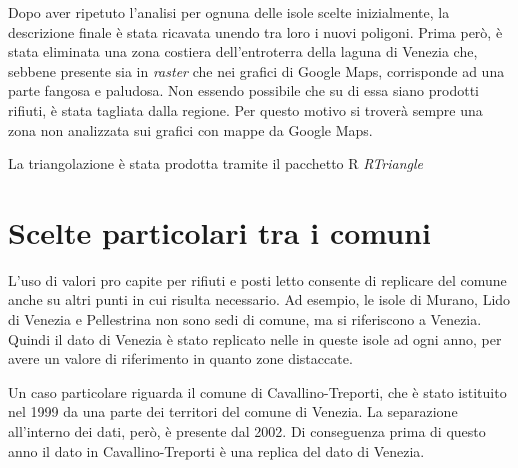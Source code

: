 \documentclass[a4paper,11pt,twoside,openright]{book}							%
\begin{document}
Dopo aver ripetuto l'analisi per ognuna delle isole scelte inizialmente, la descrizione finale è stata ricavata unendo tra loro i nuovi poligoni. Prima però, è stata eliminata una zona costiera dell'entroterra della laguna di Venezia che, sebbene presente sia in \textit{raster} che nei grafici di Google Maps, corrisponde ad una parte fangosa e paludosa. Non essendo possibile che su di essa siano prodotti rifiuti, è stata tagliata dalla regione. Per questo motivo si troverà sempre una zona non analizzata sui grafici con mappe da Google Maps.

La triangolazione è stata prodotta tramite il pacchetto R \textit{RTriangle}


\section{Scelte particolari tra i comuni}

L'uso di valori pro capite per rifiuti e posti letto consente di replicare del comune anche su altri punti in cui risulta necessario. Ad esempio, le isole di Murano, Lido di Venezia e Pellestrina non sono sedi di comune, ma si riferiscono a Venezia. Quindi il dato di Venezia è stato replicato nelle in queste isole ad ogni anno, per avere un valore di riferimento in quanto zone distaccate.

Un caso particolare riguarda il comune di Cavallino-Treporti, che è stato istituito nel 1999 da una parte dei territori del comune di Venezia. La separazione all'interno dei dati, però, è presente dal 2002. Di conseguenza prima di questo anno il dato in Cavallino-Treporti è una replica del dato di Venezia.
\end{document}
